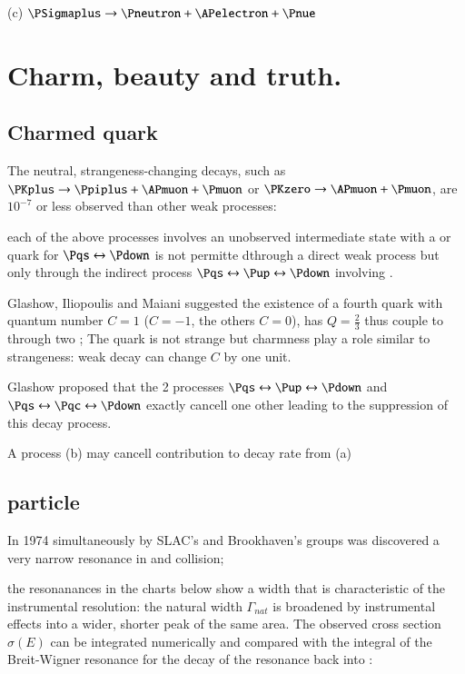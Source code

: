 \documentclass[main.tex]{subfiles}
\begin{document}
(c) $\PSigmaplus\rightarrow\Pneutron+\APelectron+\Pnue$




\clearpage

\section{Charm, beauty and truth.}

\subsection{Charmed quark}

The neutral, strangeness-changing decays, such as $\PKplus\rightarrow\Ppiplus+\APmuon+\Pmuon$ or $\PKzero\rightarrow\APmuon+\Pmuon$, are $10^{-7}$ or less observed than other weak processes:

each of the above processes involves an unobserved intermediate state with a \Pup or \APup quark for $\Pqs\leftrightarrow\Pdown$ is not permitte dthrough a direct weak process but only through the indirect process $\Pqs\leftrightarrow\Pup\leftrightarrow\Pdown$ involving \PWpm.

Glashow, Iliopoulis and Maiani suggested the existence of a fourth quark \Pqc with quantum number $C=1$ (\Paqc $C=-1$, the others $C=0$), has $Q=\frac{2}{3}$ thus couple \Pqs to \Pdown through two \PWpm; The quark \Pqc is not strange but charmness play a role similar to strangeness: weak decay can change $C$ by one unit.

Glashow proposed that the 2 processes $\Pqs\leftrightarrow\Pup\leftrightarrow\Pdown$ and $\Pqs\leftrightarrow\Pqc\leftrightarrow\Pdown$ exactly cancell one other leading to the suppression of this decay process.

A process (b) may cancell contribution to decay rate from (a)

\subsection{\PJpsi particle}

In 1974 simultaneously by SLAC's and Brookhaven's groups was discovered a very narrow resonance in \Pelectron\APelectron and \Pproton\Pproton collision;

the resonanances in the charts below show a width that is characteristic of the instrumental resolution: the natural width $\Gamma_{nat}$ is broadened by instrumental effects into a wider, shorter peak of the same area. The observed cross section $\sigma(E)$ can be integrated numerically and compared with the integral of the Breit-Wigner resonance for the decay of the resonance back into \Pelectron\APelectron:
\end{document}

